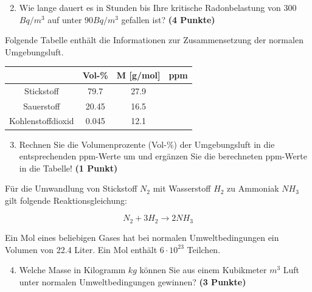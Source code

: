 \documentclass[a4paper, 10pt]{scrartcl}\usepackage[]{graphicx}\usepackage[]{xcolor}
\begin{document}
\begin{enumerate}
  \setcounter{enumi}{1}
\item Wie lange dauert es in Stunden bis Ihre kritische Radonbelastung von
  300$Bq/m^3$ auf unter 90$Bq/m^3$ gefallen ist?
  \textbf{(4 Punkte)}
\end{enumerate}

Folgende Tabelle enth{\"a}lt die Informationen zur Zusammensetzung der
normalen Umgebungsluft.

\begin{center}
  \begin{tabular}{ c|c|c|c }
     & Vol-\% & M [g/mol] & ppm \\
    \hline
    Stickstoff & 79.7 & 27.9 &
                                                    \phantom{1000000000000}\strut\\
        \hline
    Sauerstoff & 20.45 & 16.5 &
                                                    \phantom{10000000}\strut\\
        \hline
    Kohlenstoffdioxid & 0.045 & 12.1 & \phantom{10000000}\strut\\     
     \hline
\end{tabular}
\end{center}

\begin{enumerate}
   \setcounter{enumi}{2}
\item Rechnen Sie die Volumenprozente (Vol-\%) der Umgebungsluft in die
  entsprechenden ppm-Werte um und erg{\"a}nzen Sie die berechneten ppm-Werte in
  die Tabelle!  \textbf{(1 Punkt)}
\end{enumerate}

F{\"u}r die Umwandlung von Stickstoff $N_2$ mit Wasserstoff $H_2$ zu Ammoniak
$NH_3$ gilt folgende Reaktionsgleichung:

\begin{equation*}
  N_2 + 3H_2 \rightarrow 2NH_3
\end{equation*}  

Ein Mol eines beliebigen Gases hat bei normalen Umweltbedingungen ein
Volumen von 22.4 Liter. Ein Mol enth{\"a}lt $6 \cdot 10^{23}$ Teilchen.

\begin{enumerate}
  \setcounter{enumi}{3}
\item Welche Masse in Kilogramm $kg$ k{\"o}nnen Sie aus einem Kubikmeter $m^3$
  Luft unter normalen Umweltbedingungen gewinnen? \textbf{(3 Punkte)}
\end{enumerate}
\end{document}
